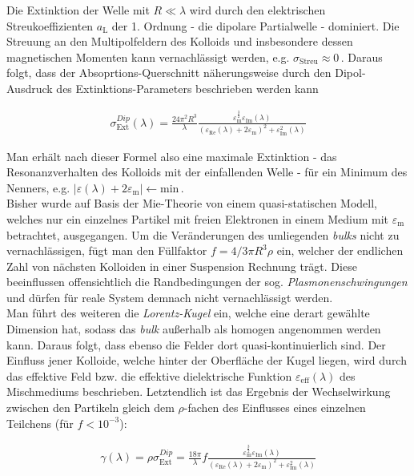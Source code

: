 \documentclass[numbers=noenddot,a4paper,notitlepage,twoside,BCOR15mm]{scrartcl}
\newcommand{\tenpo}[1]{ 10^{#1}}
\newcommand{\ix}[1]{_\text{#1}}
\newcommand{\tilt}[1]{\textit{#1}}
\begin{document}
			Die Extinktion der Welle mit $R\ll\lambda$ wird durch den elektrischen Streukoeffizienten $a\ix{L}$ der 1. Ordnung - die dipolare Partialwelle - dominiert. Die Streuung an den Multipolfeldern des Kolloids und insbesondere dessen magnetischen Momenten kann vernachlässigt werden, e.g. $\sigma\ix{Streu}\approx0$\,. Daraus folgt, dass der Absoprtions-Querschnitt näherungsweise durch den Dipol-Ausdruck des Extinktions-Parameters beschrieben werden kann

				\begin{align}
					\sigma\ix{Ext}^{Dip}\left(\lambda\right)=\frac{24\pi^2 R^3}{\lambda}\frac{\varepsilon\ix{m}^{\frac{3}{2}}\varepsilon\ix{Im}\left(\lambda\right)}{\left(\varepsilon\ix{Re}\left(\lambda\right)+2\varepsilon\ix{m}\right)^2+\varepsilon\ix{Im}^{2}\left(\lambda\right)}
				\end{align}

			Man erhält nach dieser Formel also eine maximale Extinktion - das Resonanzverhalten des Kolloids mit der einfallenden Welle - für ein Minimum des Nenners, e.g. $|\varepsilon\left(\lambda\right)+2\varepsilon\ix{m}|\leftarrow\text{min}$\,.\\
			Bisher wurde auf Basis der Mie-Theorie von einem quasi-statischen Modell, welches nur ein einzelnes Partikel mit freien Elektronen in einem Medium mit $\varepsilon\ix{m}$ betrachtet, ausgegangen. Um die Veränderungen des umliegenden \tilt{bulks} nicht zu vernachlässigen, fügt man den Füllfaktor $f=4/3\pi R^3\rho$ ein, welcher der endlichen Zahl von nächsten Kolloiden in einer Suspension Rechnung trägt. Diese beeinflussen offensichtlich die Randbedingungen der sog. \tilt{Plasmonenschwingungen} und dürfen für reale System demnach nicht vernachlässigt werden.\\
			Man führt des weiteren die \tilt{Lorentz-Kugel} ein, welche eine derart gewählte Dimension hat, sodass das \tilt{bulk} außerhalb als homogen angenommen werden kann. Daraus folgt, dass ebenso die Felder dort quasi-kontinuierlich sind. Der Einfluss jener Kolloide, welche hinter der Oberfläche der Kugel liegen, wird durch das effektive Feld bzw. die effektive dielektrische Funktion $\varepsilon\ix{eff}\left(\lambda\right)$ des Mischmediums beschrieben. Letztendlich ist das Ergebnis der Wechselwirkung zwischen den Partikeln gleich dem $\rho$-fachen des Einflusses eines einzelnen Teilchens (für $f<\tenpo{-3}$):

				\begin{align}
					\gamma\left(\lambda\right)=\rho\sigma\ix{Ext}^{Dip}=\frac{18\pi}{\lambda}f\frac{\varepsilon\ix{m}^{\frac{3}{2}}\varepsilon\ix{Im}\left(\lambda\right)}{\left(\varepsilon\ix{Re}\left(\lambda\right)+2\varepsilon\ix{m}\right)^2+\varepsilon\ix{Im}^{2}\left(\lambda\right)}
				\end{align}
\end{document}
